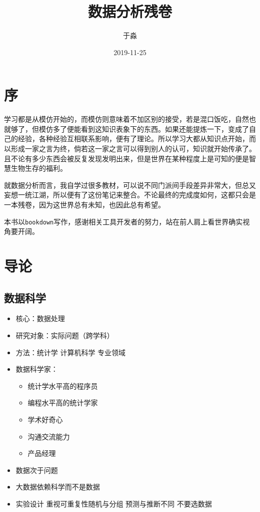 \documentclass[]{book}
\title{数据分析残卷}
\author{于淼}
\date{2019-11-25}
\providecommand{\tightlist}{%
  \setlength{\itemsep}{0pt}\setlength{\parskip}{0pt}}
\begin{document}
\maketitle

{
\setcounter{tocdepth}{1}
\tableofcontents
}
\hypertarget{ux5e8f}{%
\chapter*{序}\label{ux5e8f}}

学习都是从模仿开始的，而模仿则意味着不加区别的接受，若是混口饭吃，自然也就够了，但模仿多了便能看到这知识表象下的东西。如果还能提炼一下，变成了自己的经验，各种经验互相联系影响，便有了理论。所以学习大都从知识点开始，而以形成一家之言为终，倘若这一家之言可以得到别人的认可，知识就开始传承了。且不论有多少东西会被反复发现发明出来，但是世界在某种程度上是可知的便是智慧生物生存的福利。

就数据分析而言，我自学过很多教材，可以说不同门派间手段差异非常大，但总又妄想一统江湖，所以便有了这份笔记来整合。不论最终的完成度如何，这都只会是一本残卷，因为这世界总有未知，也因此总有希望。

本书以\texttt{bookdown}写作，感谢相关工具开发者的努力，站在前人肩上看世界确实视角要开阔。

\hypertarget{intro}{%
\chapter{导论}\label{intro}}

\hypertarget{ux6570ux636eux79d1ux5b66}{%
\section{数据科学}\label{ux6570ux636eux79d1ux5b66}}

\begin{itemize}
\tightlist
\item
  核心：数据处理
\item
  研究对象：实际问题（跨学科）
\item
  方法：统计学 计算机科学 专业领域
\item
  数据科学家：

  \begin{itemize}
  \tightlist
  \item
    统计学水平高的程序员
  \item
    编程水平高的统计学家
  \item
    学术好奇心
  \item
    沟通交流能力
  \item
    产品经理
  \end{itemize}
\item
  数据次于问题
\item
  大数据依赖科学而不是数据
\item
  实验设计 重视可重复性随机与分组 预测与推断不同 不要选数据
\end{itemize}
\end{document}

